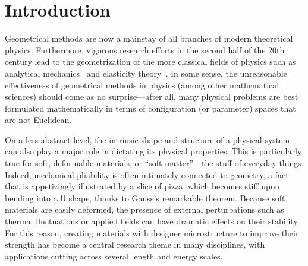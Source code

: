 
\chapter{Introduction}


Geometrical methods are now a mainstay of all branches of modern theoretical physics.
Furthermore, vigorous research efforts in the second half of the 20th century lead to the geometrization of the more classical fields of physics such as analytical mechanics~\cite{sudarshan1974,arnold1978,souder2017} and elasticity theory~\cite{marsden1994,audoly2010}.
In some sense, the unreasonable effectiveness of geometrical methods in physics (among other mathematical sciences) should come as no surprise---after all, many physical problems are best formulated mathematically in terms of configuration (or parameter) spaces that are not Euclidean.

On a less abstract level, the intrinsic shape and structure of a physical system can also play a major role in dictating its physical properties.
This is particularly true for soft, deformable materials, or ``soft matter''---the stuff of everyday things.
Indeed, mechanical pliability is often intimately connected to geometry, a fact that is appetizingly illustrated by a slice of pizza, which becomes stiff upon bending into a $\textsf{U}$ shape, thanks to Gauss's remarkable theorem.
Because soft materials are easily deformed, the presence of external perturbations such as thermal fluctuations or applied fields can have dramatic effects on their stability.
For this reason, creating materials with designer microstructure to improve their strength has become a central research theme in many disciplines, with applications cutting across several length and energy scales.

